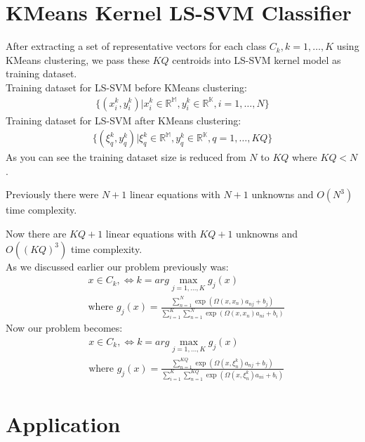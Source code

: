 \documentclass[conference]{IEEEtran}
\begin{document}
    \section{KMeans Kernel LS-SVM Classifier}\label{sec:kmeans-kernel-ls-svm-classifier}
    After extracting a set of representative vectors for each class
    $C_{k}, k=1,\ldots,K$ using KMeans clustering,
    we pass these $KQ$ centroids into LS-SVM kernel model as training dataset. \\
    Training dataset for LS-SVM before KMeans clustering:
    \begin{align*}
        \{(x_{i}^{k},y_{i}^{k})| x_{i}^{k} \in \mathbb{R^{M}},y_{i}^{k} \in \mathbb{R^{K}}, i=1,\ldots,N\}
    \end{align*}
    Training dataset for LS-SVM after KMeans clustering:
    \begin{align*}
        \{(\xi_{q}^{k},y_{q}^{k})| \xi_{q}^{k} \in \mathbb{R^{M}},y_{q}^{k} \in \mathbb{R^{K}}, q=1,\ldots,KQ\}
    \end{align*}
    As you can see the training dataset size is reduced from $N$ to $KQ$ where $KQ<N$.

    Previously there were $N+1$ linear equations with $N+1$ unknowns and $O(N^3)$ time complexity.

    Now there are $KQ+1$ linear equations with $KQ+1$ unknowns and $O((KQ)^3)$ time complexity. \\
    As we discussed earlier our problem previously was:
    \begin{align*}
        & x \in C_{k}, \Leftrightarrow k= arg \max_{j=1,\ldots,K} g_{j}(x) \\
        & \text{where } g_{j}(x) = \frac{\sum_{n=1}^{N}\exp(\Omega(x,x_{n})a_{nj} + b_{j})}{\sum_{i=1}^{K} \sum_{n=1}^{N}\exp(\Omega(x,x_{n})a_{ni} + b_{i})}
    \end{align*}
    Now our problem becomes:
    \begin{align*}
        & x \in C_{k}, \Leftrightarrow k= arg \max_{j=1,\ldots,K} g_{j}(x) \\
        & \text{where } g_{j}(x) = \frac{\sum_{n=1}^{KQ}\exp(\Omega(x,\xi_{n}^{k})a_{nj} + b_{j})}{\sum_{i=1}^{K} \sum_{n=1}^{KQ}\exp(\Omega(x,\xi_{n}^{k})a_{ni} + b_{i})}
    \end{align*}


    \section{Application}\label{sec:application}
\end{document}
